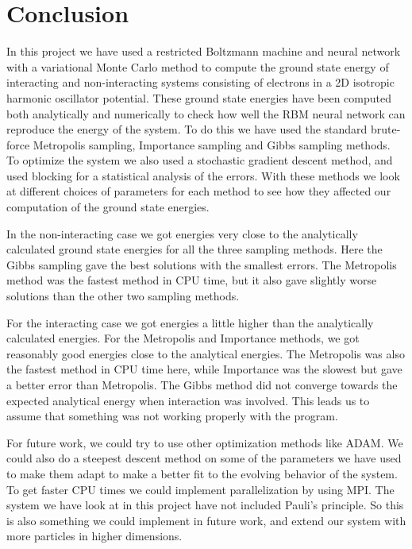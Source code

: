 \documentclass[12pt,a4paper,english]{article}
\begin{document}
\section{Conclusion}
\label{sect:Conclusion}
In this project we have used a restricted Boltzmann machine and neural network with a variational Monte Carlo method to compute the ground state energy of interacting and non-interacting systems consisting of electrons in a 2D isotropic harmonic oscillator potential. These ground state energies have been computed both analytically and numerically to check how well the RBM neural network can reproduce the energy of the system. To do this we have used the standard brute-force Metropolis sampling, Importance sampling and Gibbs sampling methods. To optimize the system we also used a stochastic gradient descent method, and used blocking for a statistical analysis of the errors. With these methods we look at different choices of parameters for each method to see how they affected our computation of the ground state energies.

In the non-interacting case we got energies very close to the analytically calculated ground state energies for all the three sampling methods. Here the Gibbs sampling gave the best solutions with the smallest errors. The Metropolis method was the fastest method in CPU time, but it also gave slightly worse solutions than the other two sampling methods.

For the interacting case we got energies a little higher than the analytically calculated energies. For the Metropolis and Importance methods, we got reasonably good energies close to the analytical energies. The Metropolis was also the fastest method in CPU time here, while Importance was the slowest but gave a better error than Metropolis. The Gibbs method did not converge towards the expected analytical energy when interaction was involved. This leads us to assume that something was not working properly with the program.

For future work, we could try to use other optimization methods like ADAM. We could also do a steepest descent method on some of the parameters we have used to make them adapt to make a better fit to the evolving behavior of the system. To get faster CPU times we could implement parallelization by using MPI. The system we have look at in this project have not included Pauli's principle. So this is also something we could implement in future work, and extend our system with more particles in higher dimensions.
\end{document}
